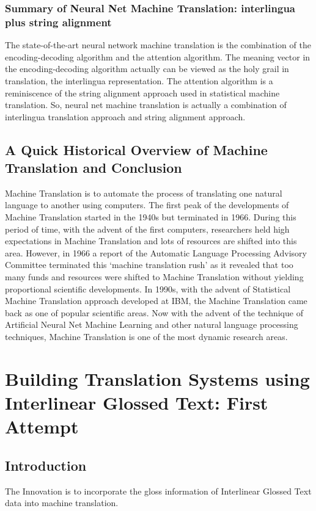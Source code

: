\documentclass[final]{ua-thesis}
\numberwithin{equation}{section}
\begin{document}
\subsection{Summary of Neural Net Machine Translation: interlingua plus string alignment}

The state-of-the-art neural network machine translation is the combination of the encoding-decoding algorithm and the attention algorithm. The meaning vector in the encoding-decoding algorithm actually can be viewed as the holy grail in translation, the interlingua representation. The attention algorithm is a reminiscence of the string alignment approach used in statistical machine translation. So, neural net machine translation is actually a combination of interlingua  translation approach and string alignment approach.   


\section{A Quick Historical Overview of Machine Translation and Conclusion}

Machine Translation is to automate the process of translating one natural language to another using computers. The first peak of the developments of Machine Translation started in the 1940s but terminated in 1966. During this period of time, with the advent of the first computers, researchers held high expectations in Machine Translation and lots of resources are shifted into this area. 
However, in 1966 a report of the Automatic Language Processing Advisory Committee \citep{pierce1966language} terminated this `machine translation rush' as it revealed that too many funds and resources were shifted to Machine Translation without yielding proportional scientific developments. 
In 1990s, with the advent of Statistical Machine Translation approach developed at IBM, the Machine Translation came back as one of popular scientific areas. 
Now with the advent of the technique of Artificial Neural Net Machine Learning and other natural language processing techniques, Machine Translation is one of the most dynamic research areas.    
\chapter{Building Translation Systems using Interlinear Glossed Text: First Attempt}
\label{chap:cake}


\section{Introduction}
The Innovation is to incorporate the gloss information of Interlinear Glossed Text data into machine translation.
\end{document}
